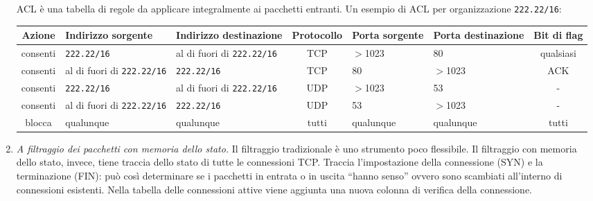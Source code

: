 \begin{enumerate}
    ACL è una tabella di regole da applicare integralmente ai pacchetti entranti. Un esempio di ACL per organizzazione \texttt{222.22/16}:
    \begin{center}
    \begin{tabular}{|c|p{2cm}|p{2.05cm}|c|p{1.5cm}|p{1.5cm}|c|}
    \hline
    \textbf{Azione} & \textbf{Indirizzo sorgente} & \textbf{Indirizzo destinazione} & \textbf{Protocollo} & \textbf{Porta sorgente} & \textbf{Porta destinazione} & \textbf{Bit di flag}\\\hline
    consenti & \texttt{222.22/16} & al di fuori di \texttt{222.22/16} & TCP & $>$1023 & 80 & qualsiasi\\\hline
    consenti & al di fuori di \texttt{222.22/16} & \texttt{222.22/16} & TCP & 80 & $>$1023 & ACK\\\hline
    consenti & \texttt{222.22/16} & al di fuori di \texttt{222.22/16} & UDP & $>$1023 & 53 & -\\\hline
    consenti & al di fuori di \texttt{222.22/16} & \texttt{222.22/16} & UDP & 53 & $>$1023 & -\\\hline
    blocca & qualunque & qualunque & tutti & qualunque & qualunque & tutti\\\hline
    \end{tabular}
    \end{center}

    \item \textit{A filtraggio dei pacchetti con memoria dello stato.} Il filtraggio tradizionale è uno strumento poco flessibile. Il filtraggio con memoria dello stato, invece, tiene traccia dello stato di tutte le connessioni TCP. Traccia l’impostazione della connessione (SYN) e la terminazione (FIN): può così determinare se i pacchetti in entrata o in uscita “hanno senso” ovvero sono scambiati all’interno di connessioni esistenti. Nella tabella delle connessioni attive viene aggiunta una nuova colonna di verifica della connessione.


\end{enumerate}
